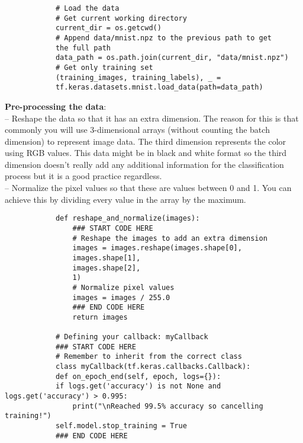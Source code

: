 \documentclass[20pt]{article}
\begin{document}
\begin{itemize}
\begin{verbatim}
			# Load the data
			# Get current working directory
			current_dir = os.getcwd()
			# Append data/mnist.npz to the previous path to get
			the full path
			data_path = os.path.join(current_dir, "data/mnist.npz")
			# Get only training set
			(training_images, training_labels), _ =
			tf.keras.datasets.mnist.load_data(path=data_path)
		\end{verbatim}
		\textbf{Pre-processing the data}:\\
		-- Reshape the data so that it has an extra dimension. The reason for this is that commonly you will use 3-dimensional arrays (without counting the batch dimension) to represent image data. The third dimension represents the color using RGB values. This data might be in black and white format so the third dimension doesn't really add any additional information for the classification process but it is a good practice regardless.\\
		-- Normalize the pixel values so that these are values between 0 and 1. You can achieve this by dividing every value in the array by the maximum.
		\begin{verbatim}
			def reshape_and_normalize(images):
				### START CODE HERE
				# Reshape the images to add an extra dimension
				images = images.reshape(images.shape[0],
				images.shape[1],
				images.shape[2],
				1)
				# Normalize pixel values
				images = images / 255.0
				### END CODE HERE
				return images
				
			# Defining your callback: myCallback
			### START CODE HERE
			# Remember to inherit from the correct class
			class myCallback(tf.keras.callbacks.Callback):
			def on_epoch_end(self, epoch, logs={}):
			if logs.get('accuracy') is not None and logs.get('accuracy') > 0.995:
				print("\nReached 99.5% accuracy so cancelling training!")
			self.model.stop_training = True
			### END CODE HERE
			
			
		\end{verbatim}
		
		
	\end{itemize}
	
\end{document}
